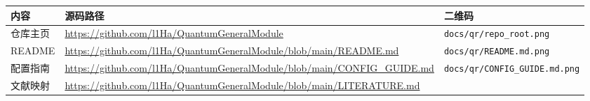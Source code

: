 \documentclass[
  a4paper,
]{ctexbook}
\begin{document}
\begin{longtable}[]{@{}lll@{}}
\toprule
\begin{minipage}[b]{0.30\columnwidth}\raggedright
内容\strut
\end{minipage} & \begin{minipage}[b]{0.30\columnwidth}\raggedright
源码路径\strut
\end{minipage} & \begin{minipage}[b]{0.30\columnwidth}\raggedright
二维码\strut
\end{minipage}\tabularnewline
\midrule
\endhead
\begin{minipage}[t]{0.30\columnwidth}\raggedright
仓库主页\strut
\end{minipage} & \begin{minipage}[t]{0.30\columnwidth}\raggedright
\url{https://github.com/l1Ha/QuantumGeneralModule}\strut
\end{minipage} & \begin{minipage}[t]{0.30\columnwidth}\raggedright
\texttt{docs/qr/repo\_root.png}\strut
\end{minipage}\tabularnewline
\begin{minipage}[t]{0.30\columnwidth}\raggedright
README\strut
\end{minipage} & \begin{minipage}[t]{0.30\columnwidth}\raggedright
\url{https://github.com/l1Ha/QuantumGeneralModule/blob/main/README.md}\strut
\end{minipage} & \begin{minipage}[t]{0.30\columnwidth}\raggedright
\texttt{docs/qr/README.md.png}\strut
\end{minipage}\tabularnewline
\begin{minipage}[t]{0.30\columnwidth}\raggedright
配置指南\strut
\end{minipage} & \begin{minipage}[t]{0.30\columnwidth}\raggedright
\url{https://github.com/l1Ha/QuantumGeneralModule/blob/main/CONFIG_GUIDE.md}\strut
\end{minipage} & \begin{minipage}[t]{0.30\columnwidth}\raggedright
\texttt{docs/qr/CONFIG\_GUIDE.md.png}\strut
\end{minipage}\tabularnewline
\begin{minipage}[t]{0.30\columnwidth}\raggedright
文献映射\strut
\end{minipage} & \begin{minipage}[t]{0.30\columnwidth}\raggedright
\url{https://github.com/l1Ha/QuantumGeneralModule/blob/main/LITERATURE.md}\strut

\end{minipage}
\end{longtable}
\end{document}
